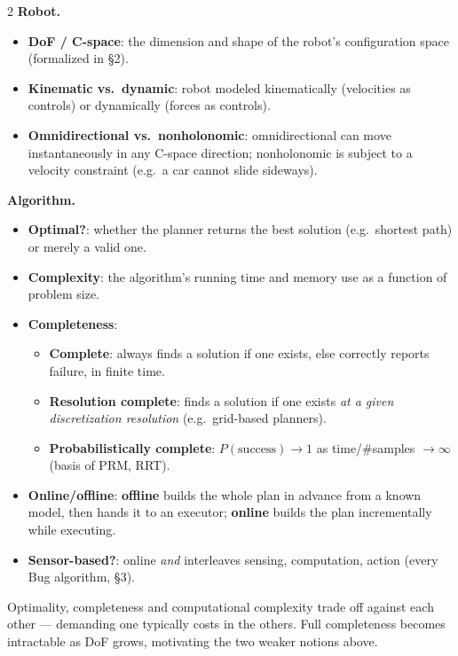 \documentclass[10pt,a4paper]{article}
\newcommand{\keyterm}[1]{\textbf{#1}}
\begin{document}
\begin{multicols}{2}
\textbf{Robot.}
\begin{itemize}
\item \keyterm{DoF / C-space}: the dimension and shape of the robot's configuration space (formalized in \S2).
\item \keyterm{Kinematic vs.\ dynamic}: robot modeled kinematically (velocities as controls) or dynamically (forces as controls).
\item \keyterm{Omnidirectional vs.\ nonholonomic}: omnidirectional can move instantaneously in any C-space direction; nonholonomic is subject to a velocity constraint (e.g.\ a car cannot slide sideways).
\end{itemize}

\textbf{Algorithm.}
\begin{itemize}
\item \keyterm{Optimal?}: whether the planner returns the best solution (e.g.\ shortest path) or merely a valid one.
\item \keyterm{Complexity}: the algorithm's running time and memory use as a function of problem size.
\item \keyterm{Completeness}:
  \begin{itemize}
  \item \keyterm{Complete}: always finds a solution if one exists, else correctly reports failure, in finite time.
  \item \keyterm{Resolution complete}: finds a solution if one exists \emph{at a given discretization resolution} (e.g.\ grid-based planners).
  \item \keyterm{Probabilistically complete}: $P(\text{success})\to 1$ as time/\#samples $\to\infty$ (basis of PRM, RRT).
  \end{itemize}
\item \keyterm{Online/offline}: \keyterm{offline} builds the whole plan in advance from a known model, then hands it to an executor; \keyterm{online} builds the plan incrementally while executing.
\item \keyterm{Sensor-based?}: online \emph{and} interleaves sensing, computation, action (every Bug algorithm, \S3).
\end{itemize}

\begin{notebox}
Optimality, completeness and computational complexity trade off against each other --- demanding one typically costs in the others. Full completeness becomes intractable as DoF grows, motivating the two weaker notions above.
\end{notebox}


\end{multicols}
\end{document}
